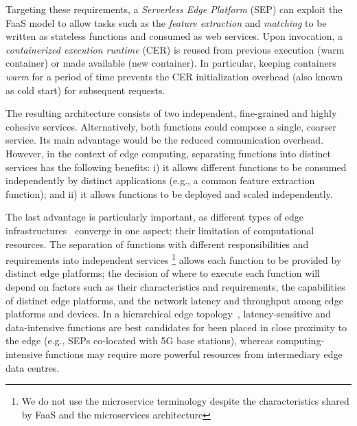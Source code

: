 Targeting these requirements, a \textit{Serverless Edge Platform} (SEP) can exploit the FaaS model to allow tasks such as the \textit{feature extraction} and \textit{matching} to be written as stateless functions and consumed as web services. Upon invocation, a \textit{containerized execution runtime} (CER) is reused from previous execution (warm container) or made available (new container). In particular, keeping containers \textit{warm} for a period of time prevents the CER initialization overhead (also known as cold start) for subsequent requests.%

The resulting architecture consists of two independent, fine-grained and highly cohesive services. Alternatively, both functions could compose a single, coarser service. Its main advantage would be the reduced communication overhead. However, in the context of edge computing, separating functions into distinct services has the following benefits:
i) it allows different functions to be consumed independently by distinct applications (e.g., a common feature extraction function); and ii) it allows functions to be deployed and scaled independently.%

The last advantage is particularly important, as different types of edge infrastructures~\cite{Satyanarayanan:2009,Taleb:2013,Liu:2014,K.Wang:2015} converge in one aspect: their limitation of computational resources. The separation of functions with different responsibilities and requirements into independent services
\footnote{We do not use the microservice terminology despite the  characteristics shared by FaaS and the microservices architecture} 
allows each function to be provided by distinct edge platforms; the decision of where to execute each function will depend on factors such as their characteristics and requirements, the capabilities of distinct edge platforms, and the network latency and throughput among edge platforms and devices. 
In a hierarchical edge topology~\cite{Liu:2014}, latency-sensitive and data-intensive functions are best candidates for been placed in close proximity to the edge (e.g., SEPs co-located with 5G base stations), whereas computing-intensive functions may require more powerful resources from intermediary edge data centres. 

